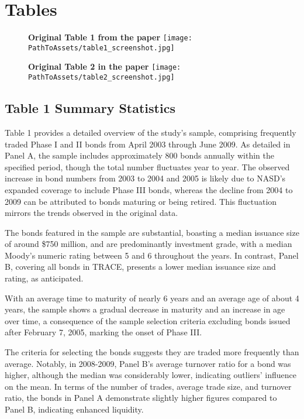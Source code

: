 \documentclass{article}
\newcommand*{\PathToAssets}{../assets}%
\begin{document}
\section{Tables}

\begin{figure}[hbt!]
\centering
\textbf{\large Original Table 1 from the paper}
\texttt{[image: \\PathToAssets/table1\_screenshot.jpg]}
\end{figure}
\FloatBarrier

\begin{figure}[h!]
\centering
\textbf{\large Original Table 2 in the paper}
\texttt{[image: \\PathToAssets/table2\_screenshot.jpg]}
\end{figure}
\FloatBarrier

\subsection{Table 1 Summary Statistics}

Table 1 provides a detailed overview of the study's sample, comprising frequently traded Phase I and II bonds from April 2003 through June 2009. As detailed in Panel A, the sample includes approximately 800 bonds annually within the specified period, though the total number fluctuates year to year. The observed increase in bond numbers from 2003 to 2004 and 2005 is likely due to NASD's expanded coverage to include Phase III bonds, whereas the decline from 2004 to 2009 can be attributed to bonds maturing or being retired. This fluctuation mirrors the trends observed in the original data.

The bonds featured in the sample are substantial, boasting a median issuance size of around \$750 million, and are predominantly investment grade, with a median Moody’s numeric rating between 5 and 6 throughout the years. In contrast, Panel B, covering all bonds in TRACE, presents a lower median issuance size and rating, as anticipated.

With an average time to maturity of nearly 6 years and an average age of about 4 years, the sample shows a gradual decrease in maturity and an increase in age over time, a consequence of the sample selection criteria excluding bonds issued after February 7, 2005, marking the onset of Phase III.

The criteria for selecting the bonds suggests they are traded more frequently than average. Notably, in 2008-2009, Panel B's average turnover ratio for a bond was higher, although the median was considerably lower, indicating outliers' influence on the mean. In terms of the number of trades, average trade size, and turnover ratio, the bonds in Panel A demonstrate slightly higher figures compared to Panel B, indicating enhanced liquidity.
\end{document}

